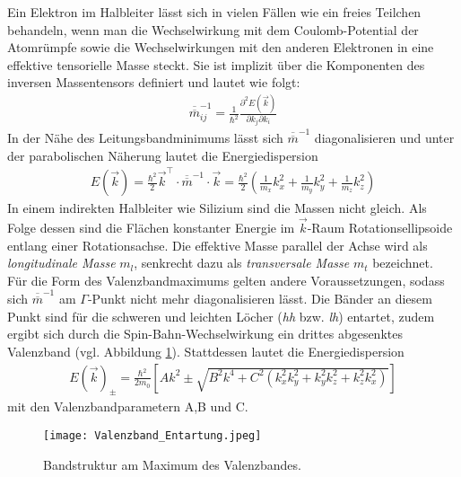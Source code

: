 Ein Elektron im Halbleiter lässt sich in vielen Fällen wie ein freies Teilchen behandeln, wenn man die Wechselwirkung mit dem Coulomb-Potential der Atomrümpfe sowie die Wechselwirkungen mit den anderen Elektronen in eine effektive tensorielle Masse steckt. Sie ist implizit über die Komponenten des inversen Massentensors definiert und lautet wie folgt:
\begin{align}
\overline{\overline{m}}_{ij}^{-1}=\frac{1}{\hbar^2}\frac{\partial^2 E(\vec{k})}{\partial k_j \partial k_i}
\end{align}
In der Nähe des Leitungsbandminimums lässt sich $\overline{\overline{m}}^{-1}$ diagonalisieren und unter der parabolischen Näherung lautet die Energiedispersion
\begin{align}
E(\vec{k})=\frac{\hbar^2}{2}\vec{k}^\intercal\cdot \overline{\overline{m}}^{-1}\cdot \vec{k}=\frac{\hbar^2}{2}\left(\frac{1}{m_x}k_x^2+\frac{1}{m_y}k_y^2+\frac{1}{m_z}k_z^2\right)
\end{align}
In einem indirekten Halbleiter wie Silizium sind die Massen nicht gleich. Als Folge dessen sind die Flächen konstanter Energie im $\vec{k}$-Raum Rotationsellipsoide entlang einer Rotationsachse. Die effektive Masse parallel der Achse wird als \emph{longitudinale Masse} $m_l$, senkrecht dazu als \emph{transversale Masse} $m_t$ bezeichnet.\\
Für die Form des Valenzbandmaximums gelten andere Voraussetzungen, sodass sich $\overline{\overline{m}}^{-1}$ am $\Gamma$-Punkt nicht mehr diagonalisieren lässt. Die Bänder an diesem Punkt sind für die schweren und leichten Löcher (\emph{hh} bzw. \emph{lh}) entartet, zudem ergibt sich durch die Spin-Bahn-Wechselwirkung ein drittes abgesenktes Valenzband (vgl. Abbildung \ref{fig:valence_degen}).
Stattdessen lautet die Energiedispersion
\begin{align}
E(\vec{k})_{\pm}=\frac{\hbar^2}{2m_0}\left[Ak^2\pm \sqrt{B^2k^4+C^2(k_x^2 k_y^2+k_y^2 k_z^2+k_z^2 k_x^2)}\right]
\end{align}
mit den Valenzbandparametern A,B und C.
\begin{figure}[h]
\begin{center}
\texttt{[image: Valenzband\_Entartung.jpeg]}
\caption{Bandstruktur am Maximum des Valenzbandes. \cite{lit:Iba09}}
\label{fig:valence_degen}
\end{center}
\end{figure}
